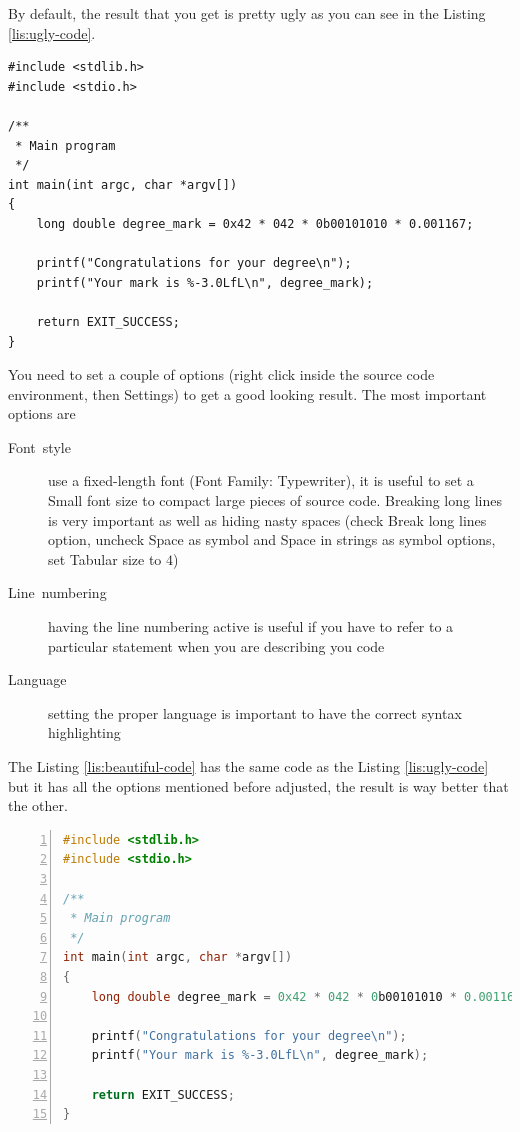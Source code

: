 By default, the result that you get is pretty ugly as you can see
in the Listing \ref{lis:ugly-code}.

\begin{lstlisting}[caption={Program that computes your degree mark},label={lis:ugly-code}]
#include <stdlib.h>
#include <stdio.h>

/**
 * Main program
 */
int main(int argc, char *argv[])
{
	long double degree_mark = 0x42 * 042 * 0b00101010 * 0.001167;

	printf("Congratulations for your degree\n");
	printf("Your mark is %-3.0LfL\n", degree_mark);

	return EXIT_SUCCESS;
}
\end{lstlisting}

You need to set a couple of options (right click inside the source
code environment, then \textsf{Settings}) to get a good looking result.
The most important options are
\begin{description}
\item [{Font~style}] use a fixed-length font (\textsf{Font Family: Typewriter}),
it is useful to set a \textsf{Small} font size to compact large pieces
of source code. Breaking long lines is very important as well as hiding
nasty spaces (check \textsf{Break long lines} option, uncheck \textsf{Space
as symbol} and \textsf{Space in strings as symbol} options, set \textsf{Tabular
size} to $4$)
\item [{Line~numbering}] having the line numbering active is useful if
you have to refer to a particular statement when you are describing
you code
\item [{Language}] setting the proper language is important to have the
correct syntax highlighting
\end{description}
The Listing \ref{lis:beautiful-code} has the same code as the Listing
\ref{lis:ugly-code} but it has all the options mentioned before adjusted,
the result is way better that the other.

\begin{lstlisting}[caption={Program that computes your degree mark},label={lis:beautiful-code},basicstyle={\small\ttfamily},breaklines=true,commentstyle={\color{purple!60!black}},extendedchars=true,identifierstyle={\color{blue!50!black}},keywordstyle={\bfseries\color{green!50!black}},language=C,numbers=left,numberstyle={\footnotesize},showstringspaces=false,stringstyle={\color{orange!40!black}},tabsize=4,xleftmargin=2em]
#include <stdlib.h>
#include <stdio.h>

/**
 * Main program
 */
int main(int argc, char *argv[])
{
	long double degree_mark = 0x42 * 042 * 0b00101010 * 0.001167;

	printf("Congratulations for your degree\n");
	printf("Your mark is %-3.0LfL\n", degree_mark);

	return EXIT_SUCCESS;
}
\end{lstlisting}

